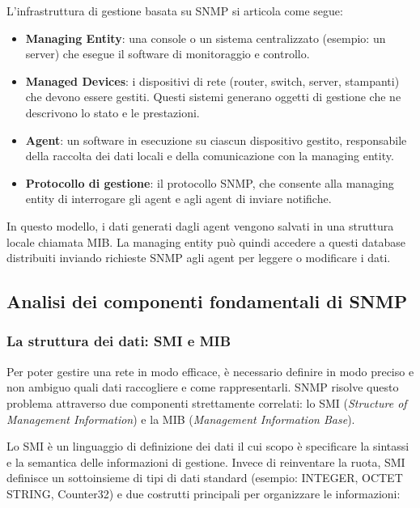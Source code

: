 L'infrastruttura di gestione basata su SNMP si articola come segue:

\begin{itemize}
\item \textbf{Managing Entity}: una console o un sistema centralizzato
(esempio: un server) che esegue il software di monitoraggio e controllo.
\item \textbf{Managed Devices}: i dispositivi di rete (router, switch, server,
stampanti) che devono essere gestiti. Questi sistemi generano oggetti di
gestione che ne descrivono lo stato e le prestazioni.
\item \textbf{Agent}: un software in esecuzione su ciascun dispositivo gestito,
responsabile della raccolta dei dati locali e della comunicazione con la
managing entity.
\item \textbf{Protocollo di gestione}: il protocollo SNMP, che consente alla
managing entity di interrogare gli agent e agli agent di inviare notifiche.
\end{itemize}

In questo modello, i dati generati dagli agent vengono salvati in una struttura
locale chiamata MIB. La managing entity può quindi accedere a questi database
distribuiti inviando richieste SNMP agli agent per leggere o modificare i dati.

\subsection{Analisi dei componenti fondamentali di SNMP}

\subsubsection{La struttura dei dati: SMI e MIB}

Per poter gestire una rete in modo efficace, è necessario definire in modo
preciso e non ambiguo quali dati raccogliere e come rappresentarli. SNMP
risolve questo problema attraverso due componenti strettamente correlati:
lo SMI (\textit{Structure of Management Information}) e la MIB
(\textit{Management Information Base}).

Lo SMI è un linguaggio di definizione dei dati il cui scopo è specificare la
sintassi e la semantica delle informazioni di gestione. Invece di reinventare la
ruota, SMI definisce un sottoinsieme di tipi di dati standard
(esempio: INTEGER, OCTET STRING, Counter32) e due costrutti principali per
organizzare le informazioni:

